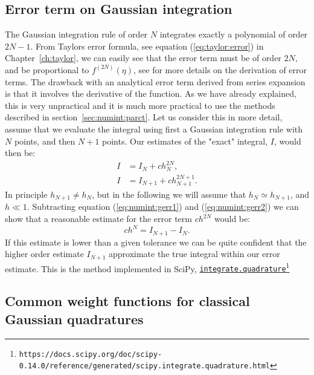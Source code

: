 \documentclass[graybox,sectrefs,envcountresetchap,open=right,final]{svmonodo}
\begin{document}
\subsection{Error term on Gaussian integration}
The Gaussian integration rule of order $N$ integrates exactly a polynomial of order $2N-1$. 
From Taylors error formula, see equation (\ref{eq:taylor:error}) in Chapter~\ref{ch:taylor},
we can easily see that the error term must be of order $2N$, and be proportional to $f^{(2N)}(\eta)$, see \cite{stoer2013} for more details on the derivation of error terms. The drawback with an analytical error term derived from series expansion is that it involves the derivative of the function. As we have already explained, this is very unpractical and it is much more practical to use the methods described in section~\ref{sec:numint:parct}. Let us consider this in more detail, assume that we evaluate the integral using first a Gaussian integration rule with $N$ points, and then $N+1$ points. Our estimates of the "exact" integral, $I$,  would then be:
\begin{align}
 I&=I_N+ch_{N}^{2N},\label{eq:numint:gerr1}\\ 
 I&=I_{N+1}+ch_{N+1}^{2N+1}.
\label{eq:numint:gerr2}
\end{align}
In principle $h_{N+1}\neq h_{N}$, but in the following we will assume that $h_N\simeq h_{N+1}$, and $h\ll 1$. Subtracting equation (\ref{eq:numint:gerr1}) and (\ref{eq:numint:gerr2}) we can show that a reasonable estimate for the error term $ch^{2N}$ would be:
\begin{equation}
ch^N= I_{N+1}-I_N.
\end{equation}
If this estimate is lower than a given tolerance we can be quite confident that the higher order estimate $I_{N+1}$ approximate the true integral within our error estimate. This is the method implemented in SciPy, \href{{https://docs.scipy.org/doc/scipy-0.14.0/reference/generated/scipy.integrate.quadrature.html}}{\nolinkurl{integrate.quadrature}\footnote{\texttt{https://docs.scipy.org/doc/scipy-0.14.0/reference/generated/scipy.integrate.quadrature.html}}}

\subsection{Common weight functions for classical Gaussian quadratures}
\end{document}
